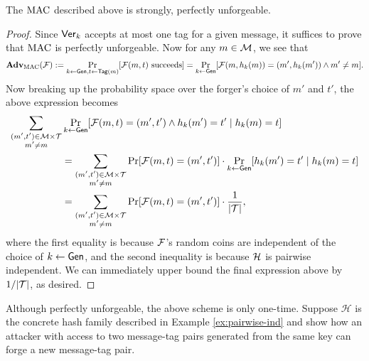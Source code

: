 \documentclass[11pt]{article}
\begin{document}
\begin{theorem}
  \label{thm:pwise-unforgeable}
  The $\text{MAC}$ described above is strongly, perfectly unforgeable.
\end{theorem}

\begin{proof}
  Since $\mathsf{Ver}_{k}$ accepts at most one tag for a given message, it
  suffices to prove that $\text{MAC}$ is perfectly unforgeable.  Now for any
  $m \in \mathcal{M}$, we see that
  \[
  \mathbf{Adv}_{\text{MAC}}(\mathcal{F}) := \Pr_{k \gets \mathsf{Gen}, t \gets
    \mathsf{Tag}(m)}[\mathcal{F}(m, t) \text{ succeeds}] = \Pr_{k \gets
    \mathsf{Gen}}[\mathcal{F}(m, h_k(m)) = (m', h_k(m')) \wedge m' \neq m].
  \]
  Now breaking up the probability space over the forger's choice of
  $m'$ and $t'$, the above expression becomes
  \begin{align*}
    \sum_{\substack{(m',t') \in \mathcal{M} \times \mathcal{T} \\ m' \neq
        m}} &\Pr_{k \gets \mathsf{Gen}}[\mathcal{F}(m, t) = (m',t') \wedge
    h_{k}(m')=t' \mid h_{k}(m) = t] \\
    & = \sum_{\substack{(m',t') \in \mathcal{M} \times \mathcal{T} \\
        m' \neq m}} \Pr[\mathcal{F}(m, t) = (m',t')] \cdot \Pr_{k \gets
      \mathsf{Gen}}[h_k(m') = t' \mid h_{k}(m) = t] \\
    & = \sum_{\substack{(m',t') \in \mathcal{M} \times \mathcal{T} \\
        m' \neq m}} \Pr[\mathcal{F}(m, t) = (m',t')] \cdot
    \frac{1}{|\mathcal{T}|},
  \end{align*}
  where the first equality is because $\mathcal{F}$'s random coins are
  independent of the choice of $k \gets \mathsf{Gen}$, and the second
  inequality is because $\mathcal{H}$ is pairwise independent.  We can
  immediately upper bound the final expression above by
  $1/\lvert\mathcal{T}\rvert$, as desired.
\end{proof}

\begin{question}[ID=one-time]
  Although perfectly unforgeable, the above scheme is only
  one-time. Suppose \(\mathcal{H}\) is the concrete hash family
  described in Example \ref{ex:pairwise-ind} and show how an attacker
  with access to two message-tag pairs generated from the same key can
  forge a new message-tag pair.
\end{question}
\end{document}
